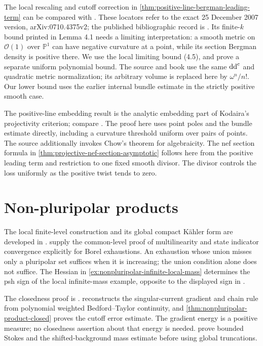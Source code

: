 The local rescaling and cutoff correction in \cref{thm:positive-line-bergman-leading-term} can be compared with \cite[Section 4, Lemma 4.1, formula (4.5) and Lemma 4.4, pp.~22--25]{Berman2007v2}. These locators refer to the exact 25 December 2007 version, arXiv:0710.4375v2; the published bibliographic record is \cite{Ber11}. Its finite-$k$ bound printed in Lemma 4.1 needs a limiting interpretation: a smooth metric on $\mathcal O(1)$ over $\mathbb P^1$ can have negative curvature at a point, while its section Bergman density is positive there. We use the local limiting bound (4.5), and prove a separate uniform polynomial bound. The source and book use the same $\mathrm{dd}^{\mathrm{c}}$ and quadratic metric normalization; its arbitrary volume is replaced here by $\omega^n/n!$. Our lower bound uses the earlier internal bundle estimate in the strictly positive smooth case.

The positive-line embedding result is the analytic embedding part of Kodaira's projectivity criterion; compare \cite[Chapter VII, Theorem 13.1 and Corollary 13.3, pp.~358--359; Theorem 14.1, pp.~359--360]{DemBook}. The proof here uses point poles and the bundle estimate directly, including a curvature threshold uniform over pairs of points. The source additionally invokes Chow's theorem for algebraicity. The nef section formula in \cref{thm:projective-nef-section-asymptotic} follows here from the positive leading term and restriction to one fixed smooth divisor. The divisor controls the loss uniformly as the positive twist tends to zero.

\section{Non-pluripolar products}\label{sec:history-nonpluripolar}
The local finite-level construction and its global compact K\"ahler form are developed in \cite[Section 1.2, Proposition 1.4, Lemma 1.5 and Proposition 1.6, pp.~203--207]{BEGZ10}.  supply the common-level proof of multilinearity and state indicator convergence explicitly for Borel exhaustions. An exhaustion whose union misses only a pluripolar set suffices when it is increasing; the union condition alone does not suffice. The Hessian in \cref{ex:nonpluripolar-infinite-local-mass} determines the psh sign of the local infinite-mass example, opposite to the displayed sign in \cite[Example 1.3, pp.~204--205]{BEGZ10}.

The closedness proof is \cite[Theorem 1.8 and Lemma 1.9, pp.~207--210]{BEGZ10}.  reconstructs the singular-current gradient and chain rule from polynomial weighted Bedford--Taylor continuity, and \cref{thm:nonpluripolar-product-closed} proves the cutoff error estimate. The gradient energy is a positive measure; no closedness assertion about that energy is needed.  prove bounded Stokes and the shifted-background mass estimate before using global truncations.

